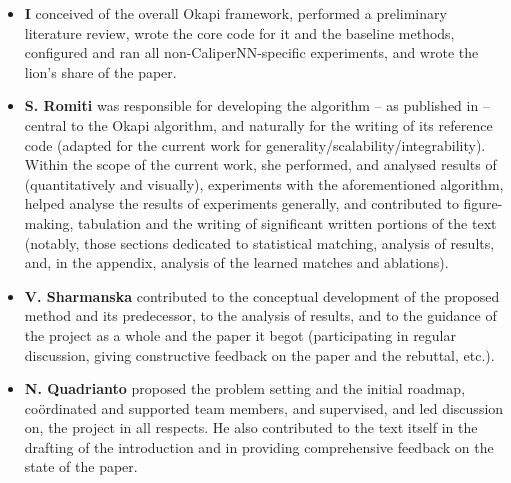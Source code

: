 %
{\renewcommand\labelitemi{}
%
\begin{itemize}
  \item 
    \textbf{I} conceived of the overall Okapi framework, performed a preliminary literature review,
    wrote the core code for it and the baseline methods, configured and ran all
    non-CaliperNN-specific experiments, and wrote the lion's share of the paper.
  \item 
    \textbf{S. Romiti} was responsible for developing the \CNN{} algorithm -- as published in
    \citet{RomInsShaQua22} -- central to the Okapi algorithm, and naturally for the writing of its
    reference code (adapted for the current work for generality/scalability/integrability).
    Within the scope of the current work, she performed, and analysed results of (quantitatively
    and visually), experiments with the aforementioned \CNN{} algorithm,  helped analyse the
    results of experiments generally, and contributed to figure-making, tabulation and the writing
    of significant written portions of the text (notably, those sections dedicated to statistical
    matching, analysis of results, and, in the appendix, analysis of the learned matches and
    \CNN{} ablations).
  \item 
    \textbf{V. Sharmanska} contributed to the conceptual development of the proposed method and its
    predecessor, to the analysis of results, and to the guidance of the project as a whole and the
    paper it begot (participating in regular discussion, giving constructive feedback on the paper
    and the rebuttal, etc.).
  \item 
    \textbf{N. Quadrianto} proposed the problem setting and the initial roadmap, co\"ordinated and
    supported team members, and supervised, and led discussion on, the project in all respects.
    He also contributed to the text itself in the drafting of the introduction and in providing
    comprehensive feedback on the state of the paper.
\end{itemize}
%
}
